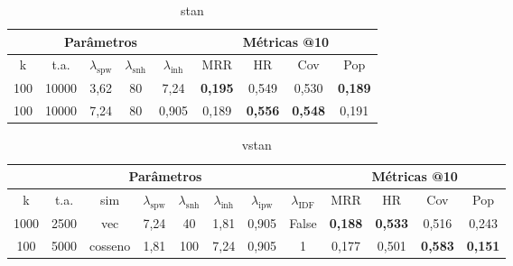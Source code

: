 \begin{table}[htbp]
  \centering
  \begin{tabular}{|c|c|c|c|c|c|c|c|c|}
    \hline
      \multicolumn{5}{|c|}{Parâmetros} & \multicolumn{4}{c|}{Métricas @10} \\
      \hline
      k & t.a. & $\lambda_{\text{spw}}$ & $\lambda_{\text{snh}}$ & $\lambda_{\text{inh}}$ & MRR & HR & Cov & Pop \\
      \hline
      100 & 10000 & 3,62 & 80 & 7,24 & \textbf{0,195} & 0,549 & 0,530 & \textbf{0,189}  \\
      \hline
      100 & 10000 & 7,24 & 80 & 0,905 & 0,189 & \textbf{0,556} & \textbf{0,548} & 0,191 \\
      \hline
\end{tabular}
      \caption{stan}
      \label{opt:stan_last}
\end{table}

\begin{table}[htbp]
  \centering
  \begin{tabular}{|c|c|c|c|c|c|c|c|c|c|c|c|}
    \hline
      \multicolumn{8}{|c|}{Parâmetros} & \multicolumn{4}{c|}{Métricas @10} \\
      \hline
      k & t.a. & sim & $\lambda_{\text{spw}}$ & $\lambda_{\text{snh}}$ & $\lambda_{\text{inh}}$ & $\lambda_{\text{ipw}}$ & $\lambda_{\text{IDF}}$ & MRR & HR & Cov & Pop \\
      \hline
      1000 & 2500 & vec & 7,24 & 40 & 1,81 & 0,905 & False & \textbf{0,188} & \textbf{0,533} & 0,516 & 0,243 \\
      \hline
      100 & 5000 & cosseno & 1,81 & 100 & 7,24 & 0,905 & 1 & 0,177 & 0,501 & \textbf{0,583} & \textbf{0,151} \\
      \hline
\end{tabular}
      \caption{vstan}
      \label{opt:vstan_last}
\end{table}


